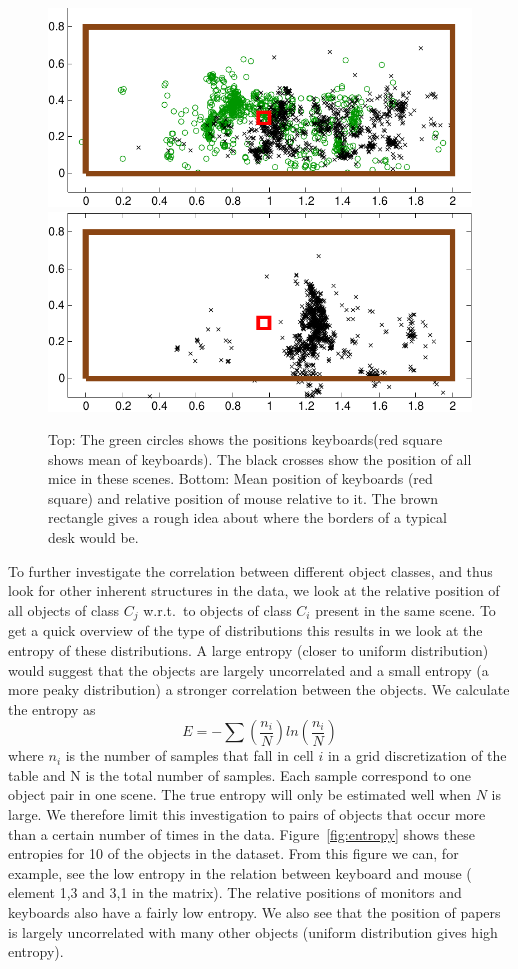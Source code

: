 \documentclass[letterpaper, 10 pt, conference]{ieeeconf}  %
\begin{document}
\begin{figure}
\begin{center}
\includegraphics[width=0.8\linewidth]{keyboard_mouse_raw-crop}
\includegraphics[width=0.8\linewidth]{keyboard_mouse-crop}
\end{center}
\caption{Top: The green circles shows the positions keyboards(red square shows mean of keyboards). The black crosses show the position of all mice in these scenes. Bottom: Mean position of keyboards (red square) and relative position of mouse relative to it. The brown rectangle gives a rough idea about where the borders of a typical desk would be.} 
\label{fig:scatter-keyboard-mouse}
\end{figure}

To further investigate the correlation between different object classes, and thus look for other inherent structures in the data, we look at 
the relative position of all objects of class $C_j$ w.r.t.\ to objects of class $C_i$ present in the same scene. To get a quick 
overview of the type of distributions this results in we look at the entropy of these distributions. A large entropy (closer to uniform 
distribution) would suggest that the objects are largely uncorrelated and a small entropy (a more peaky distribution) a stronger 
correlation between the objects. We calculate the entropy as 
\begin{equation}
E=-\sum (\frac{n_i}{N})ln(\frac{n_i}{N})
\end{equation}
where $n_i$ is the number of samples that fall in cell $i$ in a grid discretization of the table and N is the total number of samples. Each 
sample correspond to one object pair in one scene. The true entropy will only be estimated well when $N$ is large. We therefore limit this 
investigation to pairs of objects that occur more than a certain number of times in the data. Figure~\ref{fig:entropy} shows these entropies 
for 10 of the objects in the dataset. From this figure we can, for example, see the low entropy in the relation between keyboard and mouse (
element 1,3 and 3,1 in the matrix). The relative positions of monitors and keyboards also have a fairly low entropy. We also see that the 
position of papers is largely uncorrelated with many other objects (uniform distribution gives high entropy). 
\end{document}

